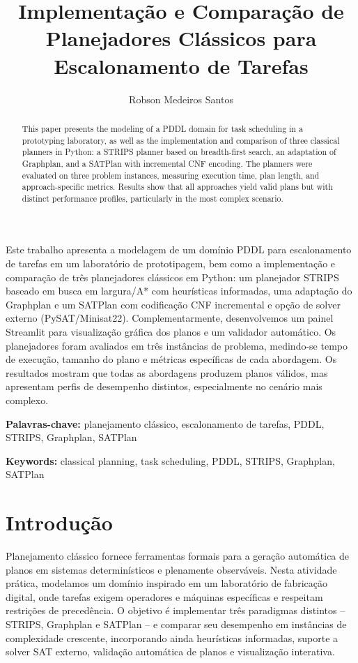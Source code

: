 \documentclass[12pt]{article}
\title{Implementação e Comparação de Planejadores Clássicos para Escalonamento de Tarefas}
\author{Robson Medeiros Santos}
\begin{document}
\maketitle

\begin{resumo}
Este trabalho apresenta a modelagem de um domínio PDDL para escalonamento de tarefas em um laboratório de prototipagem, bem como a implementação e comparação de três planejadores clássicos em Python: um planejador STRIPS baseado em busca em largura/A* com heurísticas informadas, uma adaptação do Graphplan e um SATPlan com codificação CNF incremental e opção de solver externo (PySAT/Minisat22). Complementarmente, desenvolvemos um painel Streamlit para visualização gráfica dos planos e um validador automático. Os planejadores foram avaliados em três instâncias de problema, medindo-se tempo de execução, tamanho do plano e métricas específicas de cada abordagem. Os resultados mostram que todas as abordagens produzem planos válidos, mas apresentam perfis de desempenho distintos, especialmente no cenário mais complexo.
\end{resumo}

\noindent\textbf{Palavras-chave:} planejamento clássico, escalonamento de tarefas, PDDL, STRIPS, Graphplan, SATPlan

\begin{abstract}
This paper presents the modeling of a PDDL domain for task scheduling in a prototyping laboratory, as well as the implementation and comparison of three classical planners in Python: a STRIPS planner based on breadth-first search, an adaptation of Graphplan, and a SATPlan with incremental CNF encoding. The planners were evaluated on three problem instances, measuring execution time, plan length, and approach-specific metrics. Results show that all approaches yield valid plans but with distinct performance profiles, particularly in the most complex scenario.
\end{abstract}

\noindent\textbf{Keywords:} classical planning, task scheduling, PDDL, STRIPS, Graphplan, SATPlan

\section{Introdução}
Planejamento clássico fornece ferramentas formais para a geração automática de planos em sistemas determinísticos e plenamente observáveis. Nesta atividade prática, modelamos um domínio inspirado em um laboratório de fabricação digital, onde tarefas exigem operadores e máquinas específicas e respeitam restrições de precedência. O objetivo é implementar três paradigmas distintos -- STRIPS, Graphplan e SATPlan -- e comparar seu desempenho em instâncias de complexidade crescente, incorporando ainda heurísticas informadas, suporte a solver SAT externo, validação automática de planos e visualização interativa.
\end{document}

